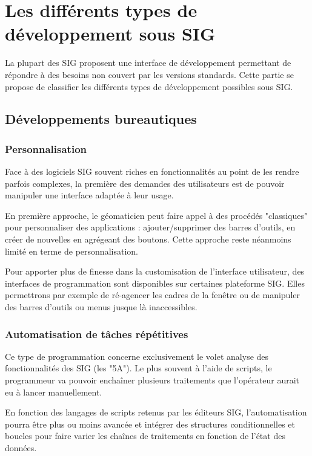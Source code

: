 \documentclass[11pt]{article}
\begin{document}
\newpage


\section{Les différents types de développement sous SIG}
La plupart des SIG proposent une interface de développement permettant de répondre à des besoins non couvert par les versions standards. Cette partie se propose de classifier les différents types de développement possibles sous SIG.


\subsection{Développements bureautiques}
\subsubsection{Personnalisation}
Face à des logiciels SIG souvent riches en fonctionnalités au point de les rendre parfois complexes, la première des demandes des utilisateurs est de pouvoir manipuler une interface adaptée à leur usage. 

En première approche, le géomaticien peut faire appel à des procédés "classiques" pour personnaliser des applications : ajouter/supprimer des barres d'outils, en créer de nouvelles en agrégeant des boutons. Cette approche reste néanmoins limité en terme de personnalisation.

Pour apporter plus de finesse dans la customisation de l'interface utilisateur, des interfaces de programmation sont disponibles sur certaines plateforme SIG. Elles permettrons par exemple de ré-agencer les cadres de la fenêtre ou de manipuler des barres d'outils ou menus jusque là inaccessibles.


\subsubsection{Automatisation de tâches répétitives}
Ce type de programmation concerne exclusivement le volet analyse des fonctionnalités des SIG (les "5A"). Le plus souvent à l'aide de scripts, le programmeur va pouvoir enchaîner plusieurs traitements que l'opérateur aurait eu à lancer manuellement.

En fonction des langages de scripts retenus par les éditeurs SIG, l'automatisation pourra être plus ou moins avancée et intégrer des structures conditionnelles et boucles pour faire varier les chaînes de traitements en fonction de l'état des données.
\end{document}
